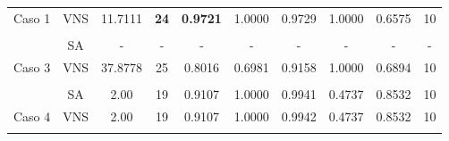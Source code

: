 \begin{table}
{\begin{tabular}{cccccccccc}
			\multicolumn{1}{c|}{\multirow{-2}{*}{Caso 1}} & VNS & 11.7111                                                              & {\color[HTML]{9A0000} \textbf{24}}                                 & {\color[HTML]{9A0000} \textbf{0.9721}}                  & 1.0000 & 0.9729 & 1.0000 & 0.6575 & 10           \\
			&     &                                                                      &                                                                    &                                                         &        &        &        &        &              \\
			\multicolumn{1}{c|}{}                         & SA  & -                                                                    & -                                                                  & -                                                       & -      & -      & -      & -      & -            \\
			\multicolumn{1}{c|}{\multirow{-2}{*}{Caso 3}} & VNS & 37.8778                                                              & 25                                                                 & 0.8016                                                  & 0.6981 & 0.9158 & 1.0000 & 0.6894 & 10           \\
			&     &                                                                      &                                                                    &                                                         &        &        &        &        &              \\
			\multicolumn{1}{c|}{}                         & SA  & 2.00                                                                 & 19                                                                 & 0.9107                                                  & 1.0000 & 0.9941 & 0.4737 & 0.8532 & 10           \\
			\multicolumn{1}{c|}{\multirow{-2}{*}{Caso 4}} & VNS & 2.00                                                               & 19                                                                 & 0.9107                                                  & 1.0000 & 0.9942 & 0.4737 & 0.8532 & 10           \\
			&     &                                                                      &                                                                    &                                                         &        &        &        &        &              \\

\end{tabular}}
\end{table}
